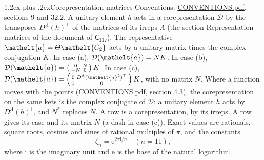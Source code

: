 \documentclass[10pt,a4paper]{article}
\makeatletter
\renewcommand\section{\@startsection{section}{1}{\z@}{-3ex plus -1ex minus -.2ex}%
  {1.2ex plus .2ex}{\normalfont\large\sffamily\bfseries\color{parttitle}}}
\numberwithin{equation}{section}
\newcommand{\eltfont}[1]{{\let\sigma\eltsigma\mathelt{#1}}}
\newcommand{\grp}[1]{\mathsf{#1}}
\newcommand{\elt}[1]{\eltfont{#1}}
\newcommand{\iunit}{\mathrm{i}}
\newcommand{\expe}{\mathrm{e}}
\newcommand{\rootunity}[1]{\zeta_{#1}}
\makeatother
\begin{document}
\section{Corepresentation matrices}\label{s:corep_matrices}
Conventions: \href{../../CONVENTIONS.pdf}{CONVENTIONS.pdf}, sections \href{../../../rotation/CONVENTIONS.pdf\#conv.9}{9} and \href{../../CONVENTIONS.pdf\#conv.32.2}{32.2}.
A unitary element $h$ acts in a corepresentation $\mathcal{D}$ by the transposes $D^{\Lambda}(h)^{\top}$ of the matrices of its irreps $\Lambda$ (the section Representation matrices of the document of \href{../../../rotation/data/pdf/C11v.pdf}{$\grp{C_{11v}}$}). The representative $\elt{a} = \varTheta\elt{C_{2}}$ acts by a unitary matrix times the complex conjugation $K$.
In case (a), $\mathcal{D}(\elt{a}) = NK$. In case (b), $\mathcal{D}(\elt{a}) = \left(\begin{smallmatrix} 0 & N \\ -N & 0 \end{smallmatrix}\right) K$. In case (c), $\mathcal{D}(\elt{a}) = \left(\begin{smallmatrix} 0 & D^{\Lambda}(\elt{a}^2)^{\top} \\ 1 & 0 \end{smallmatrix}\right) K$, with no matrix $N$.
Where a function moves with the points (\href{../../CONVENTIONS.pdf}{CONVENTIONS.pdf}, section \href{../../../rotation/CONVENTIONS.pdf\#conv.4.3}{4.3}), the corepresentation on the same kets is the complex conjugate of $\mathcal{D}$: a unitary element $h$ acts by $D^{\Lambda}(h)^{\dagger}$, and $N^{*}$ replaces $N$.
A row is a corepresentation, by its irreps. A row gives its case and its matrix $N$ (a dash in case (c)).
\leavevmode\label{n:constant.root}\label{n:index.root.order}Exact values are rationals, square roots, cosines and sines of rational multiples of $\pi$, and the constants
\begin{equation}\label{e:constants}\rootunity{n} = \expe^{2\pi\iunit/n}\quad(n = 11),\end{equation}
where $\iunit$ is the imaginary unit and $\expe$ is the base of the natural logarithm.
\end{document}

